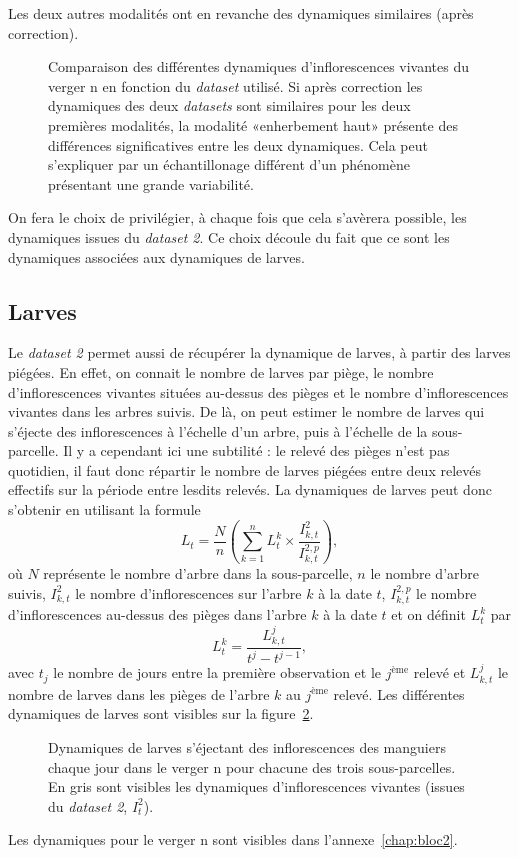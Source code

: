 Les deux autres modalités ont en revanche des dynamiques similaires (après correction).
\begin{figure}[ht]
\centering
{}
\caption{Comparaison des différentes dynamiques d'inflorescences vivantes du verger n en fonction du \emph{dataset} utilisé. Si après correction les dynamiques des deux \emph{datasets} sont similaires pour les deux premières modalités, la modalité «enherbement haut» présente des différences significatives entre les deux dynamiques. Cela peut s'expliquer par un échantillonage différent d'un phénomène présentant une grande variabilité.}
\label{fig:inflos}
\end{figure}

On fera le choix de privilégier, à chaque fois que cela s'avèrera possible, les dynamiques issues du \emph{dataset 2}.
Ce choix découle du fait que ce sont les dynamiques associées aux dynamiques de larves.


\subsection{Larves}

Le \emph{dataset 2} permet aussi de récupérer la dynamique de larves, à partir des larves piégées.
En effet, on connait le nombre de larves par piège, le nombre d'inflorescences vivantes situées au-dessus des pièges et le nombre d'inflorescences vivantes dans les arbres suivis.
De là, on peut estimer le nombre de larves qui s'éjecte des inflorescences à l'échelle d'un arbre, puis à l'échelle de la sous-parcelle.
Il y a cependant ici une subtilité : le relevé des pièges n'est pas quotidien, il faut donc répartir le nombre de larves piégées entre deux relevés effectifs sur la période entre lesdits relevés.
La dynamiques de larves peut donc s'obtenir en utilisant la formule 
\[
L_t = \frac{N}{n}\left(\sum_{k = 1}^n L_{t}^{k} \times \frac{I_{k, t}^{2}}{I_{k, t}^{2, p}} \right),
\]
où $N$ représente le nombre d'arbre dans la sous-parcelle, $n$ le nombre d'arbre suivis, $I^{2}_{k, t}$ le nombre d'inflorescences sur l'arbre $k$ à la date $t$, $I^{2, p}_{k, t}$ le nombre d'inflorescences au-dessus des pièges dans l'arbre $k$ à la date $t$ et on définit $L_t^k$ par
\[
L_t^k = \frac{L_{k, t}^j}{t^j - t^{j-1}},
\]
avec $t_j$  le nombre de jours entre la première observation et le $j^{\text{ème}}$ relevé et $L_{k, t}^j$ le nombre de larves dans les pièges de l'arbre $k$ au $j^{\text{ème}}$ relevé.
Les différentes dynamiques de larves sont visibles sur la figure~\ref{fig:larves}.
\begin{figure}[ht]
\centering
{}
\caption{Dynamiques de larves s'éjectant des inflorescences des manguiers chaque jour dans le verger n pour chacune des trois sous-parcelles. En gris sont visibles les dynamiques d'inflorescences vivantes (issues du \emph{dataset 2}, $I^2_t$).}
\label{fig:larves}
\end{figure}

Les dynamiques pour le verger n sont visibles dans l'annexe~\ref{chap:bloc2}.
